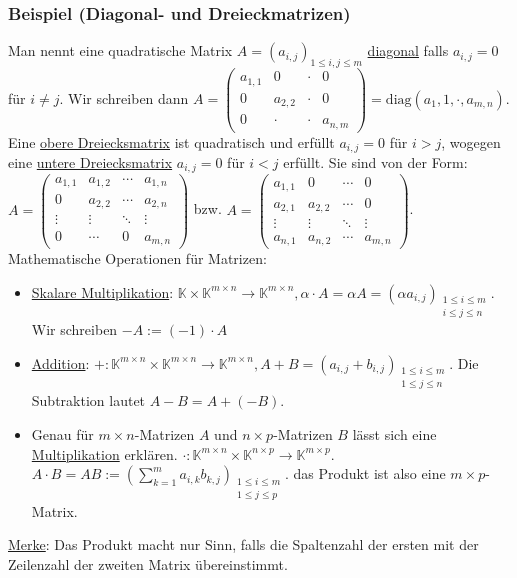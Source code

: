 \subsubsection{Beispiel (Diagonal- und Dreieckmatrizen)}
Man nennt eine quadratische Matrix $A=(a_{i,j})_{1\leq i,j\leq m}$ \underline{diagonal} falls $a_{i,j}=0$ für $i\not=j$.  Wir schreiben dann $A=\left(\begin{array}{cccc}a_{1,1} & 0 & \cdot & 0\\ 0 & a_{2,2} &\cdot & 0\\ 0 &\cdot &\cdot & a_{n,m}\end{array}\right)=\text{diag}(a_1,1,\cdot ,a_{m,n})$.  Eine \underline{obere Dreiecksmatrix} ist quadratisch und erfüllt $a_{i,j}=0$ für $i>j$, wogegen eine \underline{untere Dreiecksmatrix} $a_{i,j}=0$ für $i<j$ erfüllt.  Sie sind von der Form: $A=\left(\begin{array}{cccc}a_{1,1} & a_{1,2} & \cdots & a_{1,n}\\ 0 & a_{2,2} & \cdots & a_{2,n}\\ \vdots & \vdots & \ddots &\vdots \\ 0 & \cdots & 0 & a_{m,n}\end{array}\right)$ bzw. $A=\left(\begin{array}{cccc}a_{1,1} & 0 & \cdots & 0\\a_{2,1} & a_{2,2} & \cdots & 0 \\ \vdots & \vdots & \ddots &\vdots \\ a_{n,1} & a_{n,2}  &\cdots & a_{m,n}\end{array}\right)$.\\
Mathematische Operationen für Matrizen:
\begin{itemize}
\item \underline{Skalare Multiplikation}: $\mathbb{K}\times \mathbb{K}^{m\times n} \rightarrow \mathbb{K}^{m\times n}, \alpha \cdot A= \alpha A=(\alpha a_{i,j})_{\substack{1\leq i\leq m \\ i\leq j\leq n}}$.  Wir schreiben $-A:=(-1)\cdot A$
\item \underline{Addition}: $+:\mathbb{K}^{m\times n}\times \mathbb{K}^{m\times n} \rightarrow \mathbb{K}^{m\times n},A+B=(a_{i,j}+b_{i,j})_{\substack{1\leq i\leq m \\ 1\leq j\leq n}}$.  Die Subtraktion lautet $A-B=A+(-B)$.
\item Genau für $m\times n$-Matrizen $A$ und $n\times p$-Matrizen $B$ lässt sich eine \underline{Multiplikation} erklären.  $\cdot : \mathbb{K}^{m\times n}\times \mathbb{K}^{n\times p}\rightarrow \mathbb{K}^{m\times p}$.  $A\cdot B=AB:=(\sum^m_{k=1} a_{i,k}b_{k,j})_{\substack{1\leq i\leq m\\1\leq j\leq p}}$. das Produkt ist also eine $m\times p$-Matrix.
\end{itemize}
\underline{Merke}: Das Produkt macht nur Sinn, falls die Spaltenzahl der ersten mit der Zeilenzahl der zweiten Matrix übereinstimmt.
